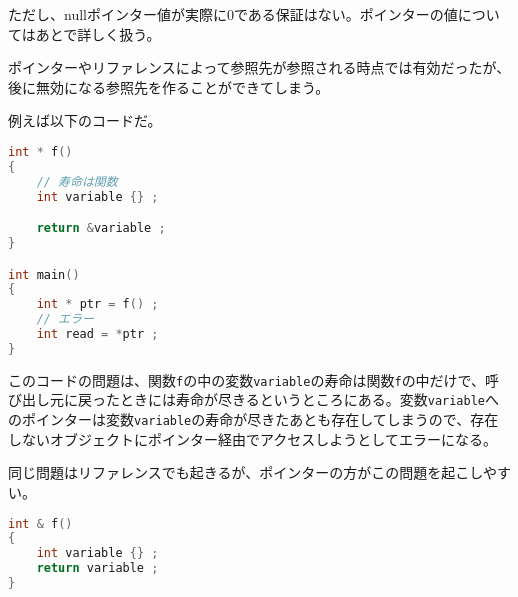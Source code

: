 ただし、nullポインター値が実際に0である保証はない。ポインターの値についてはあとで詳しく扱う。


ポインターやリファレンスによって参照先が参照される時点では有効だったが、後に無効になる参照先を作ることができてしまう。

例えば以下のコードだ。

\begin{lstlisting}[language={C++}]
int * f()
{
    // 寿命は関数
    int variable {} ;

    return &variable ;
}

int main()
{
    int * ptr = f() ;
    // エラー
    int read = *ptr ;
}
\end{lstlisting}

このコードの問題は、関数\texttt{f}の中の変数\texttt{variable}の寿命は関数\texttt{f}の中だけで、呼び出し元に戻ったときには寿命が尽きるというところにある。変数\texttt{variable}へのポインターは変数\texttt{variable}の寿命が尽きたあとも存在してしまうので、存在しないオブジェクトにポインター経由でアクセスしようとしてエラーになる。

同じ問題はリファレンスでも起きるが、ポインターの方がこの問題を起こしやすい。

\begin{lstlisting}[language={C++}]
int & f()
{
    int variable {} ;
    return variable ;
}
\end{lstlisting}

